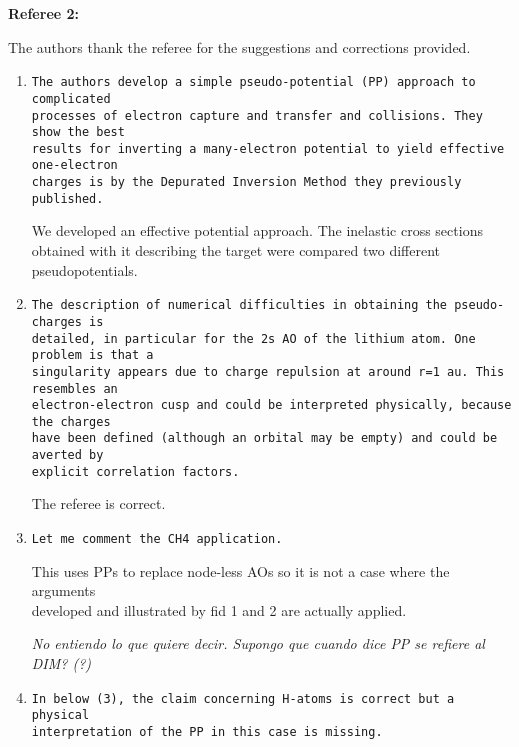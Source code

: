 \documentclass[10pt]{article}
\begin{document}
\noindent
{\bf Referee 2:} 

\vspace{0.2cm}
The authors thank the referee for the suggestions and corrections provided.

\begin{enumerate}

 \item {\tt The authors develop a simple pseudo-potential (PP) approach
 to complicated \\ processes of electron capture and transfer and
 collisions. They show the best \\ results for inverting a many-electron
 potential to yield effective one-electron \\ charges is by the Depurated
 Inversion Method they previously published.}
 
 We developed an effective potential approach. The inelastic
 cross sections obtained with it describing the target were compared
 two different pseudopotentials.

 \item {\tt The description of numerical difficulties in obtaining 
 the pseudo-charges is \\ detailed, in particular for the 2s AO of the 
 lithium atom. One problem is that a \\ singularity appears due to charge 
 repulsion at around r=1 au. This resembles an \\ electron-electron cusp 
 and could be interpreted physically, because the charges \\ have been 
 defined (although an orbital may be empty) and could be averted by 
 \\ explicit correlation factors.}
 
 The referee is correct.
 
 \item {\tt Let me comment the CH4 application.
 
 This uses PPs to replace node-less AOs so it is not a case
 where the arguments \\ developed and illustrated by fid 1 and 2 are
 actually applied.}
 
 {\it No entiendo lo que quiere decir. Supongo que cuando dice PP se
 refiere al DIM? (?)}
 
 \item {\tt In below (3), the claim concerning H-atoms is correct but 
 a physical \\ interpretation of the PP in this case is missing.}
 

\end{enumerate}
\end{document}
